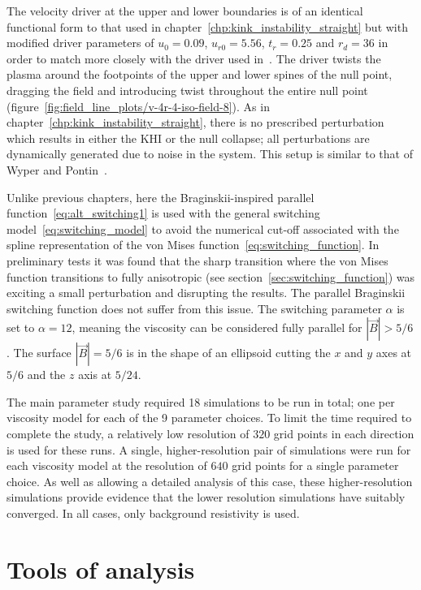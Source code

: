 The velocity driver at the upper and lower boundaries is of an identical functional form to that used in chapter~\ref{chp:kink_instability_straight} but with modified driver parameters of $u_0 = 0.09$, $u_{r0} = 5.56$, $t_r = 0.25$ and $r_d = 36$ in order to match more closely with the driver used in~\cite{wyperKelvinHelmholtzInstabilityCurrentvortex2013}. The driver twists the plasma around the footpoints of the upper and lower spines of the null point, dragging the field and introducing twist throughout the entire null point (figure~\ref{fig:field_line_plots/v-4r-4-iso-field-8}). As in chapter~\ref{chp:kink_instability_straight}, there is no prescribed perturbation which results in either the KHI or the null collapse; all perturbations are dynamically generated due to noise in the system. This setup is similar to that of Wyper and Pontin~\cite{wyperKelvinHelmholtzInstabilityCurrentvortex2013}. 

Unlike previous chapters, here the Braginskii-inspired parallel function~\eqref{eq:alt_switching1} is used with the general switching model~\eqref{eq:switching_model} to avoid the numerical cut-off associated with the spline representation of the von Mises function~\eqref{eq:switching_function}. In preliminary tests it was found that the sharp transition where the von Mises function transitions to fully anisotropic (see section~\ref{sec:switching_function}) was exciting a small perturbation and disrupting the results. The parallel Braginskii switching function does not suffer from this issue. The switching parameter $\alpha$ is set to $\alpha=12$, meaning the viscosity can be considered fully parallel for $|\vec{B}| > 5/6$. The surface $|\vec{B}| = 5/6$ is in the shape of an ellipsoid cutting the $x$ and $y$ axes at $5/6$ and the $z$ axis at $5/24$.

The main parameter study required 18 simulations to be run in total; one per viscosity model for each of the 9 parameter choices. To limit the time required to complete the study, a relatively low resolution of $320$ grid points in each direction is used for these runs. A single, higher-resolution pair of simulations were run for each viscosity model at the resolution of $640$ grid points for a single parameter choice. As well as allowing a detailed analysis of this case, these higher-resolution simulations provide evidence that the lower resolution simulations have suitably converged. In all cases, only background resistivity is used.

\section{Tools of analysis}

